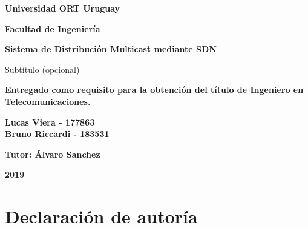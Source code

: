 \documentclass[12pt,a4paper,oneside]{book}
\begin{document}
\vspace*{\fill}

\begin{center}

\begin{Large}
\textbf{Universidad ORT Uruguay}

\textbf{Facultad de Ingeniería}
\vspace{5cm}
\end{Large}

\begin{huge}
\textbf{Sistema de Distribución Multicast mediante SDN}
\end{huge} 

\begin{Large}
Subtítulo (opcional)
\end{Large}
\bigskip
\bigskip


\textbf{Entregado como requisito para la obtención del título de Ingeniero en Telecomunicaciones.}
\vspace{5cm}

\begin{Large}
\textbf{Lucas Viera - 177863}\\
\textbf{Bruno Riccardi - 183531}\\
\bigskip

\textbf{Tutor: Álvaro Sanchez}
\vspace{2cm}
\end{Large}

\begin{huge}
\textbf{2019}
\end{huge}

\end{center}
\vspace*{\fill}

\thispagestyle{empty}
\newpage




\chapter*{Declaración de autoría}
\end{document}
